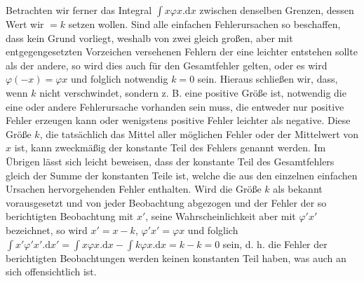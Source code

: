 Betrachten wir ferner das Integral \(\int x\varphi x.\mathrm{d}x\) zwischen denselben Grenzen, dessen Wert wir \(=k\) setzen wollen. Sind alle einfachen Fehlerursachen so beschaffen, dass kein Grund vorliegt, weshalb von zwei gleich großen, aber mit entgegengesetzten Vorzeichen versehenen Fehlern der eine leichter entstehen sollte als der andere, so wird dies auch für den Gesamtfehler gelten, oder es wird \(\varphi(-x)=\varphi x\) und folglich notwendig \(k=0\) sein. Hieraus schließen wir, dass, wenn \(k\) nicht verschwindet, sondern z. B. eine positive Größe ist, notwendig die eine oder andere Fehlerursache vorhanden sein muss, die entweder nur positive Fehler erzeugen kann oder wenigstens positive Fehler leichter als negative. Diese Größe \(k\), die tatsächlich das Mittel aller möglichen Fehler oder der Mittelwert von \(x\) ist, kann zweckmäßig der konstante Teil des Fehlers genannt werden. Im Übrigen lässt sich leicht beweisen, dass der konstante Teil des Gesamtfehlers gleich der Summe der konstanten Teile ist, welche die aus den einzelnen einfachen Ursachen hervorgehenden Fehler enthalten. Wird die Größe \(k\) als bekannt vorausgesetzt und von jeder Beobachtung abgezogen und der Fehler der so berichtigten Beobachtung mit \(x'\), seine Wahrscheinlichkeit aber mit \(\varphi' x'\) bezeichnet, so wird \(x'=x-k\), \(\varphi' x'=\varphi x\) und folglich \(\int x'\varphi' x'.\mathrm{d}x'=\int x\varphi x.\mathrm{d}x-\int k\varphi x.\mathrm{d}x=k-k=0\) sein, d. h. die Fehler der berichtigten Beobachtungen werden keinen konstanten Teil haben, was auch an sich offensichtlich ist.

